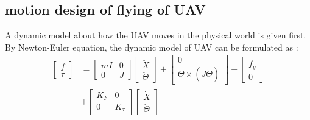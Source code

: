 \documentclass{ieeeaccess}
\begin{document}
\subsection{motion design of flying of UAV}
A dynamic model about how the UAV moves in the physical world is given first. By Newton-Euler equation, the dynamic model of UAV can be formulated as \cite{sabatino2015quadrotor}:
\begin{equation} \label{eq:uav} 
    \begin{split}
        \begin{bmatrix}
            f \\ \tau
        \end{bmatrix}&=\begin{bmatrix}
            mI & 0 \\ 0 & J
        \end{bmatrix}\begin{bmatrix}
            \ddot{X} \\ \ddot{\Theta}
        \end{bmatrix}+\begin{bmatrix}
            0 \\ \dot{\Theta}\times(J\dot{\Theta})
        \end{bmatrix}+\begin{bmatrix}
            f_g \\ 0
        \end{bmatrix}
        \\
        &+\begin{bmatrix}
            K_F & 0 \\
            0 & K_\tau
        \end{bmatrix}\begin{bmatrix}
            \dot{X} \\ \dot{\Theta}
        \end{bmatrix}
    \end{split}
\end{equation}
\end{document}
